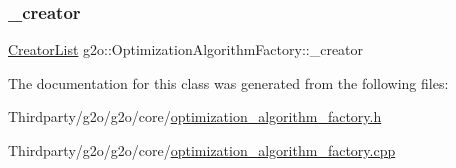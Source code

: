\subsubsection{\texorpdfstring{\+\_\+creator}{\_creator}}
{\footnotesize\ttfamily \mbox{\hyperlink{classg2o_1_1_optimization_algorithm_factory_a3ed210b94bf09b47e30d07da3766b4ec}{Creator\+List}} g2o\+::\+Optimization\+Algorithm\+Factory\+::\+\_\+creator\hspace{0.3cm}{\ttfamily [protected]}}



The documentation for this class was generated from the following files\+:\begin{DoxyCompactItemize}
\item 
Thirdparty/g2o/g2o/core/\mbox{\hyperlink{optimization__algorithm__factory_8h}{optimization\+\_\+algorithm\+\_\+factory.\+h}}\item 
Thirdparty/g2o/g2o/core/\mbox{\hyperlink{optimization__algorithm__factory_8cpp}{optimization\+\_\+algorithm\+\_\+factory.\+cpp}}\end{DoxyCompactItemize}
